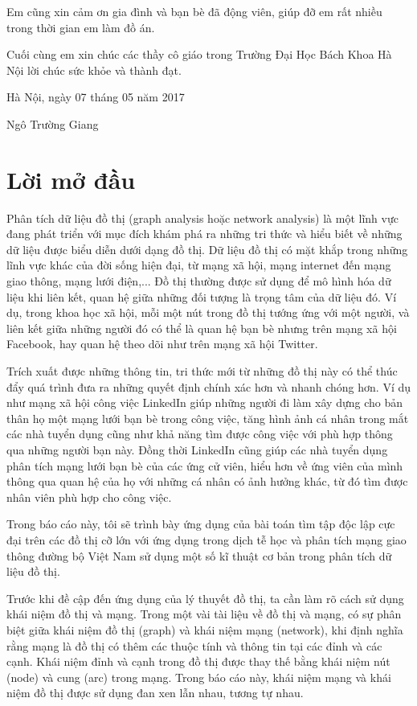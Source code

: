 \documentclass[14pt, oneside, a4paper, openany]{scrartcl}
\begin{document}
Em cũng xin cảm ơn gia đình và bạn bè đã động viên, giúp đỡ em rất nhiều trong thời gian em làm đồ án.

Cuối cùng em xin chúc các thầy cô giáo trong Trường Đại Học Bách Khoa Hà Nội lời chúc sức khỏe và thành đạt.

\begin{flushright}
	Hà Nội, ngày 07 tháng 05 năm 2017
\end{flushright}
\hspace{95 mm}Ngô Trường Giang

\newpage
{}
\section{Lời mở đầu}
Phân tích dữ liệu đồ thị (graph analysis hoặc network analysis) là một lĩnh vực đang phát triển với mục đích khám phá ra những tri thức và hiểu biết về những dữ liệu được biểu diễn dưới dạng đồ thị.
Dữ liệu đồ thị có mặt khắp trong những lĩnh vực khác của đời sống hiện đại, từ mạng xã hội, mạng internet đến mạng giao thông, mạng lưới điện,...
Đồ thị thường được sử dụng để mô hình hóa dữ liệu khi liên kết, quan hệ giữa những đối tượng là trọng tâm của dữ liệu đó.
Ví dụ, trong khoa học xã hội, mỗi một nút trong đồ thị tướng ứng với một người, và liên kết giữa những người đó có thể là quan hệ bạn bè nhưng trên mạng xã hội Facebook, hay quan hệ theo dõi như trên mạng xã hội Twitter.

Trích xuất được những thông tin, tri thức mới từ những đồ thị này có thể thúc đẩy quá trình đưa ra những quyết định chính xác hơn và nhanh chóng hơn. 
Ví dụ như mạng xã hội công việc LinkedIn giúp những người đi làm xây dựng cho bản thân họ một mạng lưới bạn bè trong công việc, tăng hình ảnh cá nhân trong mắt các nhà tuyển dụng cũng như khả năng tìm được công việc với phù hợp thông qua những người bạn này. Đồng thời LinkedIn cũng giúp các nhà tuyển dụng phân tích mạng lưới bạn bè của các ứng cử viên, hiểu hơn về ứng viên của mình thông qua quan hệ của họ với những cá nhân có ảnh hưởng khác, từ đó tìm được nhân viên phù hợp cho công việc.

Trong báo cáo này, tôi sẽ trình bày ứng dụng của bài toán tìm tập độc lập cực đại trên các đồ thị cỡ lớn với ứng dụng trong dịch tễ học và phân tích mạng giao thông đường bộ Việt Nam sử dụng một số kĩ thuật cơ bản trong phân tích dữ liệu đồ thị.

Trước khi đề cập đến ứng dụng của lý thuyết đồ thị, ta cần làm rõ cách sử dụng khái niệm đồ thị và mạng. Trong một vài tài liệu về đồ thị và mạng, có sự phân biệt giữa khái niệm đồ thị (graph) và khái niệm mạng (network), khi định nghĩa rằng mạng là đồ thị có thêm các thuộc tính và thông tin tại các đỉnh và các cạnh. Khái niệm đỉnh và cạnh trong đồ thị được thay thế bằng khái niệm nút (node) và cung (arc) trong mạng. Trong báo cáo này, khái niệm mạng và khái niệm đồ thị được sử dụng đan xen lẫn nhau, tương tự nhau.
\end{document}
